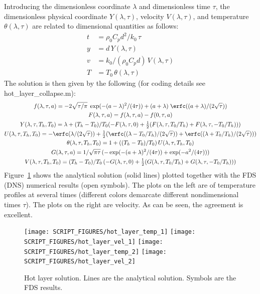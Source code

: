 \documentclass[11pt]{book}
\begin{document}
Introducing the dimensionless coordinate $\lambda$ and dimensionless time $\tau$, the dimensionless physical coordinate $Y(\lambda,\tau)$, velocity $V(\lambda,\tau)$, and temperature $\theta(\lambda,\tau)$ are related to dimensional quantities as follows:
\begin{align}
t &= \rho_0 C_p d^2/k_0 \, \tau  \\
y &= d \, Y(\lambda,\tau) \\
v &= k_0/(\rho_0 C_p d) \, V(\lambda,\tau) \\
T &= T_0 \, \theta(\lambda,\tau)
\end{align}
The solution is then given by the following (for coding details see {\ct hot\_layer\_collapse.m}):
\begin{gather}
f(\lambda,\tau,a) = -2\sqrt{\tau/\pi}\;\exp(-(a-\lambda)^2/(4\tau)) + (a+\lambda)\;\erfc((a+\lambda)/(2\sqrt{\tau})) \\
F(\lambda,\tau,a) = f(\lambda,\tau,a) - f(0,\tau,a) \\
Y(\lambda,\tau,T_h,T_0) = \lambda + (T_h-T_0)/T_0( -F(\lambda,\tau,0) + \mbox{$\frac{1}{2}$}( F(\lambda,\tau,T_0/T_h) + F(\lambda,\tau,-T_0/T_h) ) ) \\
U(\lambda,\tau,T_h,T_0) = -\erfc(\lambda/(2\sqrt{\tau})) + \mbox{$\frac{1}{2}$}( \erfc( (\lambda - T_0/T_h)/(2\sqrt{\tau}) ) + \erfc( (\lambda + T_0/T_h)/(2\sqrt{\tau}) ) ) \\
\theta(\lambda,\tau,T_h,T_0) = 1 + ( (T_h - T_0)/T_0 ) \, U(\lambda,\tau,T_h,T_0) \\
G(\lambda,\tau,a) = 1/\sqrt{\pi\tau} \, ( -\exp(-(a+\lambda)^2/(4\tau)) + \exp(-a^2/(4\tau)) ) \\
V(\lambda,\tau,T_h,T_0) = (T_h-T_0)/T_0 \, ( -G(\lambda,\tau,0) + \mbox{$\frac{1}{2}$}(G(\lambda,\tau,T_0/T_h) + G(\lambda,\tau,-T_0/T_h)) )
\end{gather}
Figure~\ref{fig_hot_layer} shows the analytical solution (solid lines) plotted together with the FDS (DNS) numerical results (open symbols).  The plots on the left are of temperature profiles at several times (different colors demarcate different nondimensional times $\tau$).  The plots on the right are velocity.  As can be seen, the agreement is excellent.

\begin{figure}[ht]
\centering
\texttt{[image: SCRIPT\_FIGURES/hot\_layer\_temp\_1]}
\texttt{[image: SCRIPT\_FIGURES/hot\_layer\_vel\_1]}
\texttt{[image: SCRIPT\_FIGURES/hot\_layer\_temp\_2]}
\texttt{[image: SCRIPT\_FIGURES/hot\_layer\_vel\_2]}
\caption[The {\ct hot\_layer\_collapse} test case]{Hot layer solution. Lines are the analytical solution.  Symbols are the FDS results.}
\label{fig_hot_layer}
\end{figure}
\end{document}
